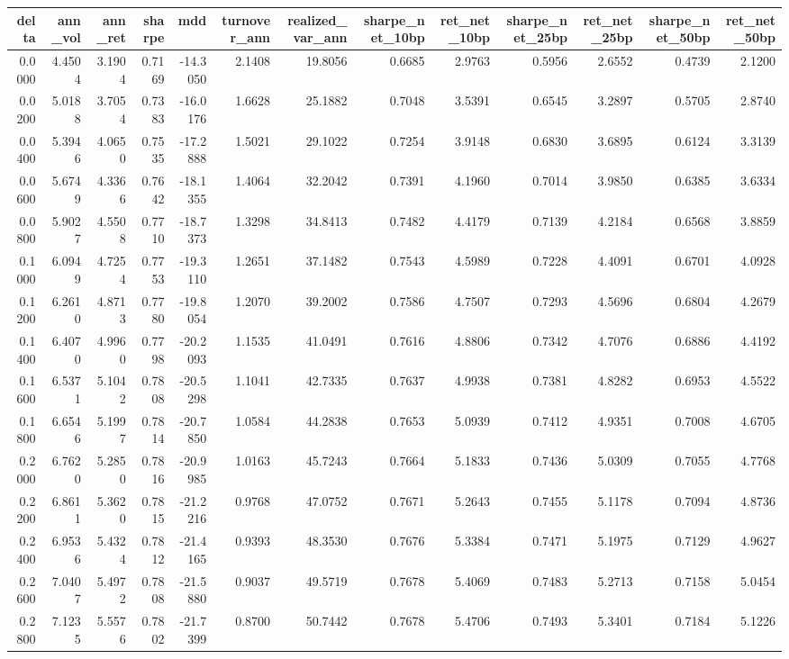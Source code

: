 \begin{tabular}{rrrrrrrrrrrrr}
\toprule
delta & ann_vol & ann_ret & sharpe & mdd & turnover_ann & realized_var_ann & sharpe_net_10bp & ret_net_10bp & sharpe_net_25bp & ret_net_25bp & sharpe_net_50bp & ret_net_50bp \\
\midrule
0.0000 & 4.4504 & 3.1904 & 0.7169 & -14.3050 & 2.1408 & 19.8056 & 0.6685 & 2.9763 & 0.5956 & 2.6552 & 0.4739 & 2.1200 \\
0.0200 & 5.0188 & 3.7054 & 0.7383 & -16.0176 & 1.6628 & 25.1882 & 0.7048 & 3.5391 & 0.6545 & 3.2897 & 0.5705 & 2.8740 \\
0.0400 & 5.3946 & 4.0650 & 0.7535 & -17.2888 & 1.5021 & 29.1022 & 0.7254 & 3.9148 & 0.6830 & 3.6895 & 0.6124 & 3.3139 \\
0.0600 & 5.6749 & 4.3366 & 0.7642 & -18.1355 & 1.4064 & 32.2042 & 0.7391 & 4.1960 & 0.7014 & 3.9850 & 0.6385 & 3.6334 \\
0.0800 & 5.9027 & 4.5508 & 0.7710 & -18.7373 & 1.3298 & 34.8413 & 0.7482 & 4.4179 & 0.7139 & 4.2184 & 0.6568 & 3.8859 \\
0.1000 & 6.0949 & 4.7254 & 0.7753 & -19.3110 & 1.2651 & 37.1482 & 0.7543 & 4.5989 & 0.7228 & 4.4091 & 0.6701 & 4.0928 \\
0.1200 & 6.2610 & 4.8713 & 0.7780 & -19.8054 & 1.2070 & 39.2002 & 0.7586 & 4.7507 & 0.7293 & 4.5696 & 0.6804 & 4.2679 \\
0.1400 & 6.4070 & 4.9960 & 0.7798 & -20.2093 & 1.1535 & 41.0491 & 0.7616 & 4.8806 & 0.7342 & 4.7076 & 0.6886 & 4.4192 \\
0.1600 & 6.5371 & 5.1042 & 0.7808 & -20.5298 & 1.1041 & 42.7335 & 0.7637 & 4.9938 & 0.7381 & 4.8282 & 0.6953 & 4.5522 \\
0.1800 & 6.6546 & 5.1997 & 0.7814 & -20.7850 & 1.0584 & 44.2838 & 0.7653 & 5.0939 & 0.7412 & 4.9351 & 0.7008 & 4.6705 \\
0.2000 & 6.7620 & 5.2850 & 0.7816 & -20.9985 & 1.0163 & 45.7243 & 0.7664 & 5.1833 & 0.7436 & 5.0309 & 0.7055 & 4.7768 \\
0.2200 & 6.8611 & 5.3620 & 0.7815 & -21.2216 & 0.9768 & 47.0752 & 0.7671 & 5.2643 & 0.7455 & 5.1178 & 0.7094 & 4.8736 \\
0.2400 & 6.9536 & 5.4324 & 0.7812 & -21.4165 & 0.9393 & 48.3530 & 0.7676 & 5.3384 & 0.7471 & 5.1975 & 0.7129 & 4.9627 \\
0.2600 & 7.0407 & 5.4972 & 0.7808 & -21.5880 & 0.9037 & 49.5719 & 0.7678 & 5.4069 & 0.7483 & 5.2713 & 0.7158 & 5.0454 \\
0.2800 & 7.1235 & 5.5576 & 0.7802 & -21.7399 & 0.8700 & 50.7442 & 0.7678 & 5.4706 & 0.7493 & 5.3401 & 0.7184 & 5.1226 \\

\end{tabular}
